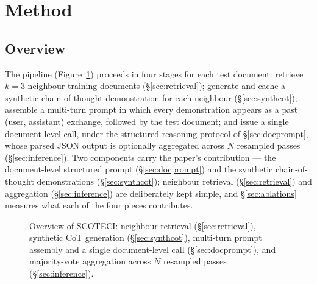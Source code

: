 \documentclass[11pt]{article}
\newcommand{\method}{SCOTECI}
\begin{document}
\section{Method}
\label{sec:method}

\subsection{Overview}
The pipeline (Figure~\ref{fig:overview}) proceeds in four stages for each test
document: retrieve $k=3$ neighbour training documents (\S\ref{sec:retrieval});
generate and cache a synthetic chain-of-thought demonstration for each neighbour
(\S\ref{sec:synthcot}); assemble a multi-turn prompt in which every demonstration
appears as a past (user, assistant) exchange, followed by the test document; and
issue a single document-level call, under the structured reasoning protocol of
\S\ref{sec:docprompt}, whose parsed JSON output is optionally aggregated across $N$
resampled passes (\S\ref{sec:inference}). Two components carry the paper's
contribution --- the document-level structured prompt (\S\ref{sec:docprompt}) and
the synthetic chain-of-thought demonstrations (\S\ref{sec:synthcot}); neighbour
retrieval (\S\ref{sec:retrieval}) and aggregation (\S\ref{sec:inference}) are
deliberately kept simple, and \S\ref{sec:ablations} measures what each of the four
pieces contributes.

\begin{figure}[t]
  \centering
  \caption{Overview of \method{}: neighbour retrieval (\S\ref{sec:retrieval}),
  synthetic CoT generation (\S\ref{sec:synthcot}), multi-turn prompt assembly and
  a single document-level call (\S\ref{sec:docprompt}), and majority-vote
  aggregation across $N$ resampled passes (\S\ref{sec:inference}).}
  \label{fig:overview}
\end{figure}
\end{document}
